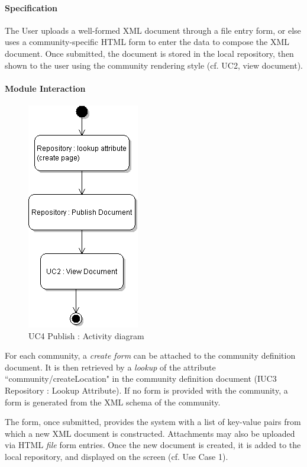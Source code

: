 \documentclass[titlepage]{article}%
\begin{document}
\paragraph{Specification}
The User uploads a well-formed XML document through a file entry form, or else uses a community-specific HTML form to enter the data to compose the XML document. Once submitted, the document is stored in the local repository, then shown to the user using the community rendering style (cf. UC2, view document).

\paragraph{Module Interaction}
\begin{figure}[htb]
\centering
	\includegraphics[scale=0.5]{diagrams/uc5-publish.png}
	\caption{UC4 Publish : Activity diagram}
	\label{fig:uc4}
\end{figure}

For each community, a \emph{create form} can be attached to the community definition document. It is then retrieved by a \emph{lookup} of the attribute ``community/createLocation" in the community definition document (IUC3 Repository : Lookup Attribute). If no form is provided with the community, a form is generated from the XML schema of the community.

The form, once submitted, provides the system with a list of key-value pairs from which a new XML document is constructed. Attachments may also be uploaded via HTML \emph{file} form entries. Once the new document is created, it is added to the local repository, and displayed on the screen (cf. Use Case 1).
\end{document}
